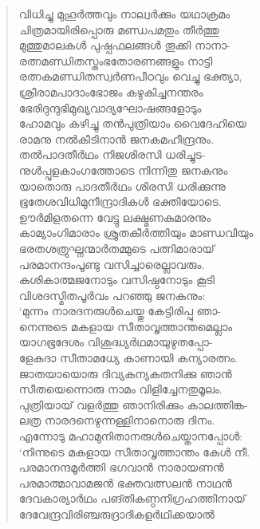 \begin{verse}
വിധിച്ചു മുഹൂര്‍ത്തവും നാല്വര്‍ക്കും യഥാക്രമം\\
ചിത്രമായിരിപ്പൊരു മണ്ഡപമതും തീര്‍ത്തു\\
മുത്തുമാലകള്‍ പുഷ്പഫലങ്ങള്‍ തൂക്കി നാനാ-\\
രത്നമണ്ഡിതസ്തംഭതോരണങ്ങളും നാട്ടി\\
രത്നകമണ്ഡിതസ്വര്‍ണപീഠവും വെച്ചു ഭക്ത്യാ,\\
ശ്രീരാമപാദാംഭോജം കഴുകിച്ചനന്തരം\\
ഭേരിദുന്ദുഭിമുഖ്യവാദ്യഘോഷങ്ങളോടും\\
ഹോമവും കഴിച്ചു തന്‍പുത്രിയാം വൈദേഹിയെ\\
രാമനു നല്‍കീടിനാന്‍ ജനകമഹീന്ദ്രനും.\\
തല്‍പാദതീര്‍ഥം നിജശിരസി ധരിച്ചുട-\\
നുള്‍പ്പുളകാംഗത്തോടെ നിന്നിതു ജനകനും\\
യാതൊരു പാദതീര്‍ഥം ശിരസി ധരിക്കുന്നു\\
ഭൂതേശവിധിമുനീന്ദ്രാദികള്‍ ഭക്തിയോടെ.\\
ഊര്‍മിളതന്നെ വേട്ടു ലക്ഷ്മണകുമാരനും\\
കാമ്യാംഗിമാരാം ശ്രുതകീര്‍ത്തിയും മാണ്ഡവിയും\\
ഭരതശത്രുഘ്നന്മാര്‍തമ്മുടെ പത്നിമാരായ്\\
പരമാനന്ദംപൂണ്ടു വസിച്ചാരെല്ലാവരും.\\
കുശികാത്മജനോടും വസിഷ്ഠനോടും കൂടി\\
വിശദസ്മിതപൂര്‍വം പറഞ്ഞു ജനകനും:\\
‘മുന്നം നാരദനരുള്‍ചെയ്തു കേട്ടിരിപ്പു ഞാ-\\
നെന്നുടെ മകളായ സീതാവൃത്താന്തമെല്ലാം\\
യാഗഭൂദേശം വിശുദ്ധ്യര്‍ഥമായുഴുതപ്പോ-\\
ളേകദാ സീതാമധ്യേ കാണായി കന്യാരത്നം.\\
ജാതയായൊരു ദിവ്യകന്യകതനിക്കു ഞാന്‍\\
സീതയെന്നൊരു നാമം വിളിച്ചേനതുമൂലം.\\
പുത്രിയായ് വളര്‍ത്തു ഞാനിരിക്കും കാലത്തിങ്ക-\\
ലത്ര നാരദനെഴുന്നള്ളിനാനൊരു ദിനം.\\
എന്നോടു മഹാമുനിതാനരുള്‍ചെയ്താനപ്പോള്‍:\\
‘നിന്നുടെ മകളായ സീതാവൃത്താന്തം കേള്‍ നീ.\\
പരമാനന്ദമൂര്‍ത്തി ഭഗവാന്‍ നാരായണന്‍\\
പരമാത്മാവാമജന്‍ ഭക്തവത്സലന്‍ നാഥന്‍\\
ദേവകാര്യാര്‍ഥം പങ്തികണ്ഠനിഗ്രഹത്തിനായ്\\
ദേവേന്ദ്രവിരിഞ്ചരുദ്രാദികളര്‍ഥിക്കയാല്‍\\

\end{verse}
